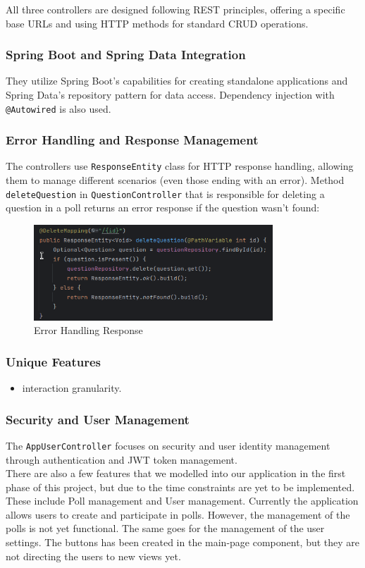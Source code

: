 All three controllers are designed following REST principles, offering a specific base URLs and using HTTP methods for standard CRUD operations.

\subsubsection{Spring Boot and Spring Data Integration}
They utilize Spring Boot's capabilities for creating standalone applications and Spring Data's repository pattern for data access. Dependency injection with \texttt{@Autowired} is also used.

\subsubsection{Error Handling and Response Management}
The controllers use \texttt{ResponseEntity} class for HTTP response handling, allowing them to manage different scenarios (even those ending with an error).  Method \texttt{deleteQuestion} in \texttt{QuestionController} that is responsible for deleting a question in a poll returns an error response if the question wasn't found:

\begin{figure}[h]
  \centering
  \includegraphics[width=0.80\textwidth]{figs/delete_mapping.png}
  \caption{Error Handling Response}
  \label{fig:my_label}
\end{figure}

\subsubsection{Unique Features}
\begin{itemize}
    \item interaction granularity.
\end{itemize}

\subsubsection{Security and User Management}
The \texttt{AppUserController} focuses on security and user identity management through authentication and JWT token management. \\


\noindent There are also a few features that we modelled into our application in the first phase of this project,
but due to the time constraints are yet to be implemented. These include Poll management and User
management. Currently the application allows users to create and participate in polls. However, the
management of the polls is not yet functional. The same goes for the management of the user
settings. The buttons has been created in the main-page component, but they are not directing the
users to new views yet.